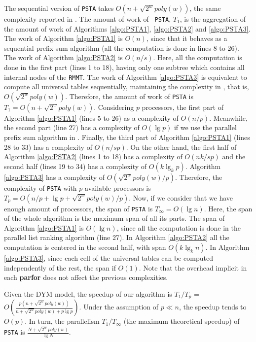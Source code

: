 The sequential version of {\tt PSTA} takes $O(n+\sqrt{2^{w}}poly(w))$,
the same complexity reported in
\cite{Navarro:2014:FFS:2620785.2601073}. The amount of work of {\tt
PSTA}, $T_1$, is the aggregation of the amount of work of Algorithms
\ref{algo:PSTA1}, \ref{algo:PSTA2} and \ref{algo:PSTA3}. The work of
Algorithm \ref{algo:PSTA1} is $O(n)$, since that it behaves as a
sequential prefix sum algorithm (all the computation is done in
lines 8 to 26). The work of Algorithm \ref{algo:PSTA2} is
$O(n/s)$. Here, all the computation is done in the first part
(lines 1 to 18), having only one subtree which contains all internal
nodes of the {\tt RMMT}. The work of Algorithm \ref{algo:PSTA3} is
equivalent to compute all universal tables sequentially, maintaining
the complexity in \cite{Navarro:2014:FFS:2620785.2601073}, that is,
$O(\sqrt{2^{w}}poly(w))$. Therefore, the amount of work of {\tt PSTA}
is $T_{1}=O(n+\sqrt{2^{w}}poly(w))$. Considering $p$ processors, the
first part of Algorithm \ref{algo:PSTA1} (lines 5 to 26) as a
complexity of $O(n/p)$. Meanwhile, the second part (line 27)
has a complexity of $O(\lg p)$ if we use the parallel prefix sum
algorithm in \cite{Reif1993}. Finally, the third part of Algorithm
\ref{algo:PSTA1} (lines 28 to 33) has a complexity of
$O(n/sp)$. On the other hand, the first half of Algorithm
\ref{algo:PSTA2} (lines 1 to 18) has a complexity of
$O(nk/sp)$ and the second half (lines 19 to 34) has a
complexity of $O(k\lg_{k}p)$. Algorithm \ref{algo:PSTA3} has a
complexity of $O(\sqrt{2^{w}}poly(w)/p)$. Therefore, the
complexity of {\tt PSTA} with $p$ available processors is $T_p =
O(n/p+\lg p+\sqrt{2^{w}}poly(w)/p)$. Now, if we consider that we have enough amount of
processors, the span of {\tt PSTA} is $T_{\infty}=O(\lg n)$. Here, the
span of the whole algorithm is the maximum span of all its parts. The
span of Algorithm \ref{algo:PSTA1} is $O(\lg n)$, since all the
computation is done in the parallel list ranking algorithm (line
27). In Algorithm \ref{algo:PSTA2} all the computation is centered in
the second half, with span $O(k\lg_{k}n)$. In Algorithm
\ref{algo:PSTA3}, since each cell of the universal tables can be
computed independently of the rest, the span if $O(1)$. Note that the
overhead implicit in each {\bf parfor} does not affect the previous
complexities.

Given the DYM model, the speedup of our algorithm is $T_1/T_p$ =
$O(\frac{p(n+\sqrt{2^{w}}poly(w))}{n+\sqrt{2^{w}}poly(w)+p\lg
p})$. Under the assumption of $p\ll n$, the speedup tends to
$O(p)$. In turn, the
parallelism $T_1/T_{\infty}$ (the maximum theoretical speedup) of {\tt
PSTA} is $\frac{N+\sqrt{2^{w}}poly(w)}{\lg N}$.

